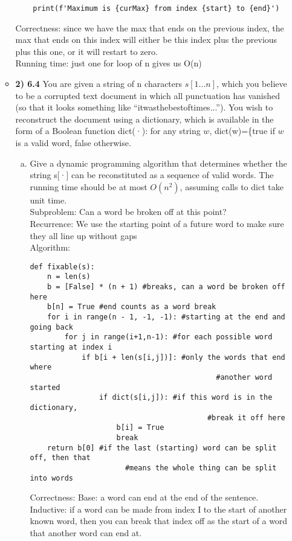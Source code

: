\documentclass[11pt]{article}
\begin{document}
\begin{itemize}
\begin{itemize}
\begin{verbatim}
    print(f'Maximum is {curMax} from index {start} to {end}')
\end{verbatim}
Correctness: since we have the max that ends on the previous index, the max that ends on this index will either be this index plus the previous plus this one, or it will restart to zero.
\\Running time: just one for loop of n gives us O(n) 

\vspace{0.05in}

\item \textbf{2) 6.4}
You are given a string of n characters $s[1 . . . n]$, which you believe to be a corrupted text document in which all punctuation has vanished (so that it looks something like “itwasthebestoftimes...”). You wish to reconstruct the document using a dictionary, which is available in the form of a Boolean function dict(·): for any string $w$, dict(w)=\{true if $w$ is a valid word, false otherwise.
\begin{enumerate}[(a)]
\item Give a dynamic programming algorithm that determines whether the string s[·] can be reconstituted as a sequence of valid words. The running time should be at most $O(n^2)$, assuming calls to dict take unit time.
\\Subproblem: Can a word be broken off at this point?
\\Recurrence: We use the starting point of a future word to make sure they all line up without gaps
\\Algorithm:
\begin{verbatim}
def fixable(s):
    n = len(s)
    b = [False] * (n + 1) #breaks, can a word be broken off here
    b[n] = True #end counts as a word break
    for i in range(n - 1, -1, -1): #starting at the end and going back
        for j in range(i+1,n-1): #for each possible word starting at index i
            if b[i + len(s[i,j])]: #only the words that end where 
                                           #another word started
                if dict(s[i,j]): #if this word is in the dictionary,
                                         #break it off here
                    b[i] = True
                    break
    return b[0] #if the last (starting) word can be split off, then that 
                      #means the whole thing can be split into words
\end{verbatim}
Correctness: Base: a word can end at the end of the sentence. Inductive: if a word can be made from index I to the start of another known word, then you can break that index off as the start of a word that another word can end at.

\end{enumerate}
\end{itemize}
\end{itemize}
\end{document}
